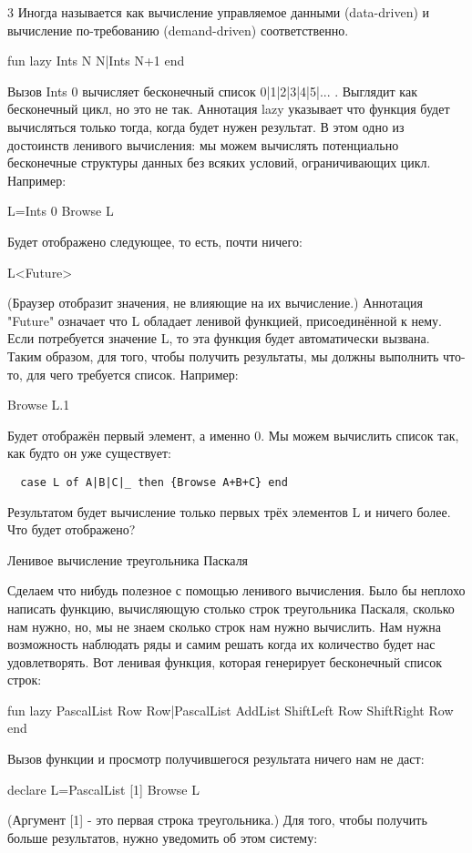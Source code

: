 3 Иногда называется как вычисление управляемое данными (data-driven) и вычисление по-требованию (demand-driven) соответственно.

fun lazy {Ints N}
N|{Ints N+1}
end

Вызов {Ints 0} вычисляет бесконечный список 0|1|2|3|4|5|... . Выглядит как бесконечный цикл, но это не так. Аннотация lazy указывает что функция будет вычисляться только тогда, когда будет нужен результат. В этом одно из достоинств ленивого вычисления: мы можем вычислять потенциально бесконечные структуры данных без всяких условий, ограничивающих цикл. Например:

L={Ints 0}
{Browse L}

Будет отображено следующее, то есть, почти ничего:

L<Future>

(Браузер отобразит значения, не влияющие на их вычисление.) Аннотация "Future" означает что L обладает ленивой функцией, присоединённой к нему. Если потребуется значение L, то эта функция будет автоматически вызвана. Таким образом, для того, чтобы получить результаты, мы должны выполнить что-то, для чего требуется список. Например:

{Browse L.1}

Будет отображён первый элемент, а именно 0. Мы можем вычислить список так, как будто он уже существует:

\begin{lstlisting}
  case L of A|B|C|_ then {Browse A+B+C} end
  \end{lstlisting}

Результатом будет вычисление только первых трёх элементов L и ничего более. Что будет отображено?

Ленивое вычисление треугольника Паскаля

Сделаем что нибудь полезное с помощью ленивого вычисления. Было бы неплохо написать функцию, вычисляющую столько строк треугольника Паскаля, сколько нам нужно, но, мы не знаем сколько строк нам нужно вычислить. Нам нужна возможность наблюдать ряды и самим решать когда их количество будет нас удовлетворять. Вот ленивая функция, которая генерирует бесконечный список строк:

fun lazy {PascalList Row}
Row|{PascalList
{AddList {ShiftLeft Row}
{ShiftRight Row}}}
end

Вызов функции и просмотр получившегося результата ничего нам не даст:

declare
L={PascalList [1]}
{Browse L}

(Аргумент [1] - это первая строка треугольника.) Для того, чтобы получить больше результатов, нужно уведомить об этом систему:

